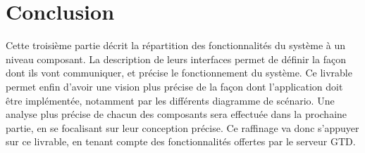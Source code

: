 \chapter{Conclusion}

Cette troisième partie décrit la répartition des fonctionnalités du système à
un niveau composant. La description de leurs interfaces permet de définir la
façon dont ils vont communiquer, et précise le fonctionnement du système. Ce
livrable permet enfin d'avoir une vision plus précise de la façon dont
l'application doit être implémentée, notamment par les différents diagramme de
scénario.
\medskip
Une analyse plus précise de chacun des composants sera effectuée dans la
prochaine partie, en se focalisant sur leur conception précise. Ce raffinage va donc
s'appuyer sur ce livrable, en tenant compte des fonctionnalités offertes par le
serveur GTD.
